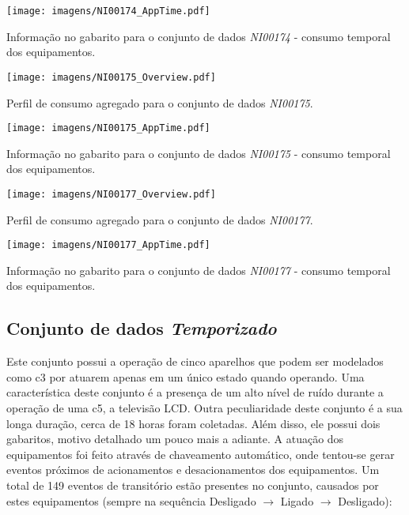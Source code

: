 \begin{SidewaysFigure}
\centering
\texttt{[image: imagens/NI00174\_AppTime.pdf]}
\caption{Informação no gabarito para o conjunto de dados
\emph{NI00174} - consumo temporal dos equipamentos.}
\label{fig:ni00174_app_time}
\end{SidewaysFigure}

\begin{SidewaysFigure}
\centering
\texttt{[image: imagens/NI00175\_Overview.pdf]}
\caption{Perfil de consumo agregado para o conjunto de dados
\emph{NI00175}.}
\label{fig:ni00175_overview}
\end{SidewaysFigure}

\begin{SidewaysFigure}
\centering
\texttt{[image: imagens/NI00175\_AppTime.pdf]}
\caption{Informação no gabarito para o conjunto de dados
\emph{NI00175} - consumo temporal dos equipamentos.}
\label{fig:ni00175_app_time}
\end{SidewaysFigure}

\begin{SidewaysFigure}
\centering
\texttt{[image: imagens/NI00177\_Overview.pdf]}
\caption{Perfil de consumo agregado para o conjunto de dados
\emph{NI00177}.}
\label{fig:ni00177_overview}
\end{SidewaysFigure}

\begin{SidewaysFigure}
\centering
\texttt{[image: imagens/NI00177\_AppTime.pdf]}
\caption{Informação no gabarito para o conjunto de dados
\emph{NI00177} - consumo temporal dos equipamentos.}
\label{fig:ni00177_app_time}
\end{SidewaysFigure}

\FloatBarrier
\subsection{Conjunto de dados \emph{Temporizado}}
\label{ssec:temp}

Este conjunto possui a operação de cinco aparelhos que podem ser
modelados como \acs{c3} por atuarem apenas em um único estado quando
operando. Uma característica deste conjunto é a presença de um alto
nível de ruído durante a operação de uma \acs{c5}, a televisão LCD.
Outra peculiaridade deste conjunto é a sua longa duração, cerca de 18
horas foram coletadas. Além disso, ele possui dois gabaritos, motivo
detalhado um pouco mais a adiante. A atuação dos equipamentos foi
feito através de chaveamento automático, onde tentou-se gerar eventos
próximos de acionamentos e desacionamentos dos equipamentos. Um total
de 149 eventos de transitório estão presentes no conjunto, causados
por estes equipamentos (sempre na sequência Desligado $\rightarrow$
Ligado $\rightarrow$ Desligado):

